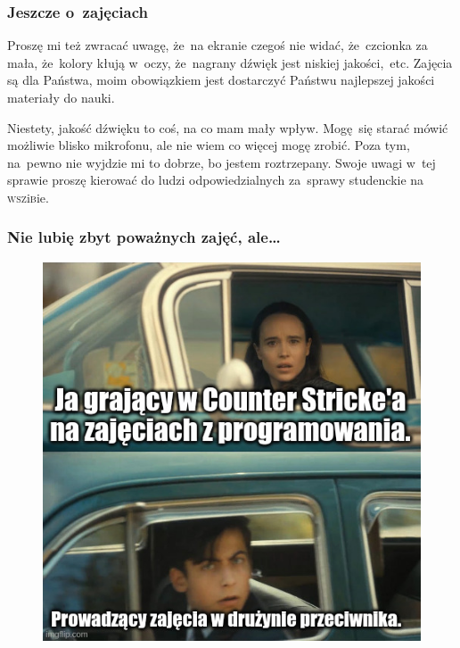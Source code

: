 \documentclass[10pt,t]{beamer}
\begin{document}
\begin{frame}
  \frametitle{Jeszcze o~zajęciach}






  Proszę mi też zwracać uwagę, że~na ekranie czegoś nie widać,
  że~czcionka za mała, że~kolory kłują w~oczy, że~nagrany dźwięk
  jest niskiej jakości,~etc. Zajęcia są dla Państwa, moim obowiązkiem jest
  dostarczyć Państwu najlepszej jakości materiały do nauki.

  Niestety, jakość dźwięku to coś, na co mam mały wpływ. Mogę~się starać
  mówić możliwie blisko mikrofonu, ale nie wiem co więcej mogę zrobić.
  Poza tym, na~pewno nie wyjdzie mi to dobrze, bo jestem roztrzepany.
  Swoje uwagi w~tej sprawie proszę kierować do ludzi odpowiedzialnych
  za~sprawy studenckie na \textsc{wsz}i\textsc{b}ie.

\end{frame}





\begin{frame}
  \frametitle{Nie lubię zbyt poważnych zajęć, ale\ldots}

  \vspace{-0.5em}


  \begin{figure}

    \label{fig:Jak-to-bywa-na-zajeciach}

    \centering


    \includegraphics[scale=0.42]
    {./Presentations-pictures/Jak-to-bywa-na-zajeciach.jpeg}

  \end{figure}

\end{frame}
\end{document}
